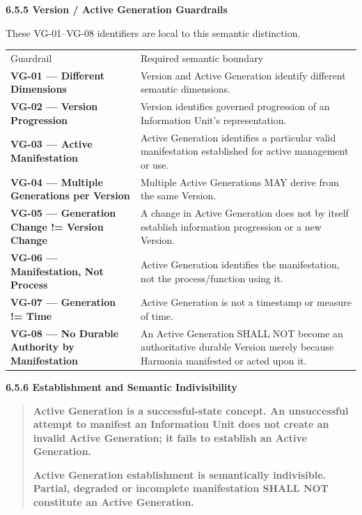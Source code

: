 \par\medskip\textbf{6.5.5 Version / Active Generation Guardrails}\par


These VG-01–VG-08 identifiers are local to this semantic distinction.



\begin{longtable}{>{\raggedright\arraybackslash}p{}>{\raggedright\arraybackslash}p{}}
Guardrail & Required semantic boundary \\
\textbf{VG-01 — Different Dimensions} & Version and Active Generation identify different semantic dimensions. \\
\textbf{VG-02 — Version Progression} & Version identifies governed progression of an Information Unit's representation. \\
\textbf{VG-03 — Active Manifestation} & Active Generation identifies a particular valid manifestation established for active management or use. \\
\textbf{VG-04 — Multiple Generations per Version} & Multiple Active Generations MAY derive from the same Version. \\
\textbf{VG-05 — Generation Change != Version Change} & A change in Active Generation does not by itself establish information progression or a new Version. \\
\textbf{VG-06 — Manifestation, Not Process} & Active Generation identifies the manifestation, not the process/function using it. \\
\textbf{VG-07 — Generation != Time} & Active Generation is not a timestamp or measure of time. \\
\textbf{VG-08 — No Durable Authority by Manifestation} & An Active Generation SHALL NOT become an authoritative durable Version merely because Harmonia manifested or acted upon it. \\
\end{longtable}


\par\medskip\textbf{6.5.6 Establishment and Semantic Indivisibility}\par


\begin{quote}


\textbf{Active Generation is a successful-state concept. An unsuccessful attempt to manifest an Information Unit does not create an invalid Active Generation; it fails to establish an Active Generation.}



\textbf{Active Generation establishment is semantically indivisible. Partial, degraded or incomplete manifestation SHALL NOT constitute an Active Generation.}



\end{quote}


